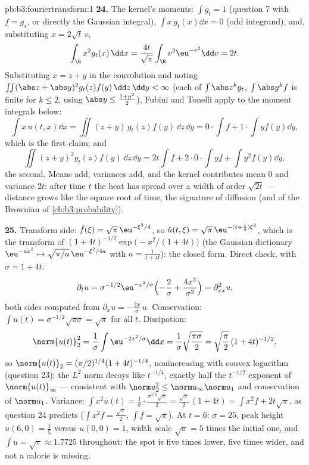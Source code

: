 \begin{solution}{pb:b3:fouriertransform:1}
\textbf{24.} The kernel's moments: $\int g_t = 1$ (question
7 with $f = g_s$, or directly the Gaussian integral), $\int
x\,g_t(x)\dd x = 0$ (odd integrand), and, substituting $x =
2\sqrt t\,v$,
\[
\int_\R x^2g_t(x)\,\dd x
= \frac{4t}{\sqrt\pi}\int_\R v^2\eu^{-v^2}\dd v = 2t .
\]
Substituting $x = z + y$ in the convolution and noting
$\iint(\abs z + \abs y)^2g_t(z)f(y)\,\dd z\,\dd y < \infty$
(each of $\int\abs z^kg_t$, $\int\abs y^kf$ is finite for $k
\leq 2$, using $\abs y \leq \frac{1 + y^2}2$), Fubini and
Tonelli apply to the moment integrals below:
\[
\int x\,u(t,x)\dd x = \iint (z + y)\,g_t(z)f(y)\,\dd z\,\dd
y = 0\cdot\!\int\! f + 1\cdot\!\int\! yf(y)\dd y,
\]
which is the first claim; and
\[
\iint (z+y)^2g_t(z)f(y)\,\dd z\,\dd y
= 2t\int f + 2\cdot0\cdot\!\int\! yf + \int y^2f(y)\dd y ,
\]
the second. Means add, variances add, and the kernel
contributes mean $0$ and variance $2t$: after time $t$ the
heat has spread over a width of order $\sqrt{2t}$ ---
distance grows like the square root of time, the signature
of diffusion (and of the Brownian  of
\cref{ch:b3:probability}).

\textbf{25.} Transform side: $\hat f(\xi) =
\sqrt\pi\,\eu^{-\xi^2/4}$, so $\hat u(t,\xi) =
\sqrt\pi\,\eu^{-(t + \frac14)\xi^2}$, which is the transform
of $(1 + 4t)^{-1/2}\exp\bigl(-x^2/(1+4t)\bigr)$ (the
Gaussian dictionary $\eu^{-ax^2} \mapsto
\sqrt{\pi/a}\,\eu^{-\xi^2/4a}$ with $a = \frac1{1+4t}$):
the closed form. Direct check, with $\sigma = 1 + 4t$:
\[
\partial_tu = \sigma^{-1/2}\eu^{-x^2/\sigma}
\Bigl(-\frac2\sigma + \frac{4x^2}{\sigma^2}\Bigr)
= \partial^2_{xx}u ,
\]
both sides computed from $\partial_xu =
-\frac{2x}\sigma\,u$. Conservation: $\int u(t) =
\sigma^{-1/2}\sqrt{\pi\sigma} = \sqrt\pi$ for all $t$.
Dissipation:
\[
\norm{u(t)}_2^2 = \frac1\sigma\int\eu^{-2x^2/\sigma}\dd x
= \frac1\sigma\sqrt{\frac{\pi\sigma}2}
= \sqrt{\frac\pi2}\,(1+4t)^{-1/2},
\]
so $\norm{u(t)}_2 = (\pi/2)^{1/4}(1+4t)^{-1/4}$,
nonincreasing with convex logarithm (question 23); the
$L^2$ norm decays like $t^{-1/4}$, exactly half the
$t^{-1/2}$ exponent of $\norm{u(t)}_\infty$ --- consistent
with $\norm u_2^2 \leq \norm u_\infty\norm u_1$ and
conservation of $\norm u_1$. Variance: $\int x^2u(t) =
\frac1\sigma\cdot\frac{\sigma^{3/2}\sqrt\pi}2 =
\frac{\sqrt\pi}2\,(1 + 4t) = \int x^2f + 2t\sqrt\pi$, as
question 24 predicts ($\int x^2f = \frac{\sqrt\pi}2$, $\int
f = \sqrt\pi$). At $t = 6$: $\sigma = 25$, peak height
$u(6, 0) = \frac15$ versus $u(0,0) = 1$, width scale
$\sqrt\sigma = 5$ times the initial one, and $\int u =
\sqrt\pi \approx 1.7725$ throughout: the spot is five times
lower, five times wider, and not a calorie is missing.
\end{solution}
